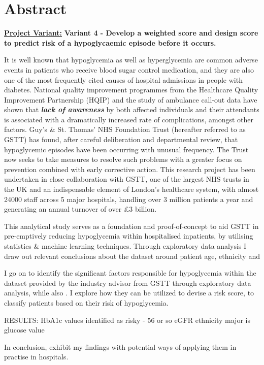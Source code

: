 
\section*{Abstract}


    \textbf{\underline{Project Variant:}} \textbf{ Variant 4 - Develop a weighted score and design score to predict risk of a hypoglycaemic episode before it occurs.} 

    \vspace{10pt}
    \par{ \noindent It is well known that hypoglycemia as well as hyperglycemia are common adverse events in patients who receive blood sugar control medication, and they are also one of the most frequently cited causes of hospital admissions in people with diabetes. National quality improvement programmes from the Healthcare Quality Improvement Partnership (HQIP) and the study of ambulance call-out data have shown that \textbf{\textit{lack of awareness}} by both affected individuals and their attendants is associated with a dramatically increased rate of complications, amongst other factors. Guy's \& St. Thomas' NHS Foundation Trust (hereafter referred to as GSTT) has found, after careful deliberation and departmental review, that hypoglycemic episodes have been occurring with unusual frequency. The Trust now seeks to take measures to resolve such problems with a greater focus on prevention combined with early corrective action. This research project has been undertaken in close collaboration with GSTT, one of the largest NHS trusts in the UK and an indispensable element of London's healthcare system, with almost 24000 staff across 5 major hospitals, handling over 3 million patients a year and generating an annual turnover of over \pounds3 billion.}

    \vspace{10pt}
    \par{ \noindent This analytical study serves as a foundation and proof-of-concept to aid GSTT in pre-emptively reducing hypoglycemia within hospitalised inpatients, by utilising statistics \& machine learning techniques. Through exploratory data analysis I draw out relevant conclusions about the dataset around patient age, ethnicity and 
    
    I go on to identify the significant factors responsible for hypoglycemia within the dataset provided by the industry advisor from GSTT through exploratory data analysis, while also . I explore how they can be utilized to devise a risk score, to classify patients based on their risk of hypoglycemia. 
    
    RESULTS:
    HbA1c values identified as risky - 56 or so 
    eGFR 
    ethnicity
    major is glucose value 
    
 In conclusion, exhibit my findings with potential ways of applying them in practise in hospitals.}

